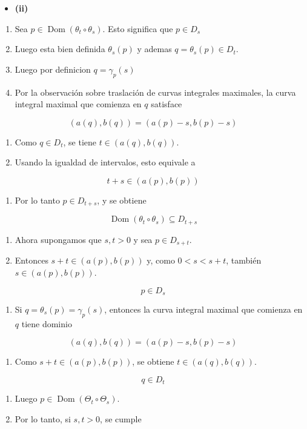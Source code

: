 \begin{bookproof}{}
\begin{itemize}
\item \textbf{(ii)}
\end{itemize}
\begin{enumerate}
\item Sea $p\in\operatorname{Dom}(\theta_t\circ\theta_s)$. Esto significa que $p\in D_s$
\item Luego esta bien definida $\theta_{s}(p)$ y ademas $q=\theta_s(p)\in D_t$.
\item Luego por definicion $q=\gamma_p(s)$
\item Por la observación sobre traslación de curvas integrales maximales, la curva integral maximal que comienza en $q$ satisface
\end{enumerate}
\[
(a(q),b(q))=(a(p)-s,b(p)-s)
\]
\begin{enumerate}[start=5]
\item Como $q\in D_t$, se tiene $t\in(a(q),b(q))$.
\item Usando la igualdad de intervalos, esto equivale a
\end{enumerate}
\[
t+s\in(a(p),b(p))
\]
\begin{enumerate}[start=7]
\item Por lo tanto $p\in D_{t+s}$, y se obtiene
\end{enumerate}
\[
\operatorname{Dom}(\theta_t\circ\theta_s)\subseteq D_{t+s}
\]
\begin{enumerate}[start=8]
\item Ahora supongamos que $s,t>0$ y sea $p\in D_{s+t}$.
\item Entonces $s+t\in(a(p),b(p))$ y, como $0<s<s+t$, también $s\in(a(p),b(p))$.
\end{enumerate}
\[
p\in D_s
\]
\begin{enumerate}[start=10]
\item Si $q=\theta_s(p)=\gamma_p(s)$, entonces la curva integral maximal que comienza en $q$ tiene dominio
\end{enumerate}
\[
(a(q),b(q))=(a(p)-s,b(p)-s)
\]
\begin{enumerate}[start=11]
\item Como $s+t\in(a(p),b(p))$, se obtiene $t\in(a(q),b(q))$.
\end{enumerate}
\[
q\in D_t
\]
\begin{enumerate}[start=12]
\item Luego $p\in\operatorname{Dom}(\Theta_t\circ\Theta_s)$.
\item Por lo tanto, si $s,t>0$, se cumple
\end{enumerate}

\end{bookproof}

